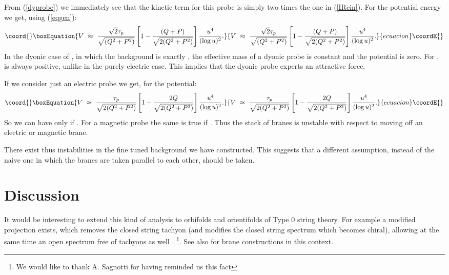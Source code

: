 \documentclass[a4paper,12pt]{article}
\begin{document}
From (\ref{dyprobe}) we immediately see that the kinetic term for this probe is
simply two times the one in (\ref{IRcin}). For the potential energy we get, 
using (\ref{eqgen}):
\begin{equation}\coord{}\boxEquation{
V~\approx~ {{\sqrt {2}\tau_p}\over{\sqrt {(Q^2 + P^2)}}}\left[ 1- {(Q+ P)\over{\sqrt{2(Q^2 + P^2)}}}\right]{u^4\over(\log u)^2} .
}{
V~\approx~ {{\sqrt {2}\tau_p}\over{\sqrt {(Q^2 + P^2)}}}\left[ 1- {(Q+ P)\over{\sqrt{2(Q^2 + P^2)}}}\right]{u^4\over(\log u)^2} .
}{ecuacion}\coordE{}\end{equation}
In the dyonic case \coordHE{} of \cite{kt1}, in which the background is exactly \coordHE{}, the effective mass of a dyonic probe is constant and the potential is zero. For \coordHE{}, \coordHE{} is always positive, unlike in the purely electric case. This implies that the dyonic probe experts an attractive 
force. 

If we consider just an electric  probe we get, for the potential:
\begin{equation}\coord{}\boxEquation{
V~\approx~ {\tau_p\over \sqrt {2(Q^2 + P^2)}}\left[1- {2Q\over{\sqrt{2(Q^2 + P^2)}}}\right]{u^4\over(\log u)^2}.
}{
V~\approx~ {\tau_p\over \sqrt {2(Q^2 + P^2)}}\left[1- {2Q\over{\sqrt{2(Q^2 + P^2)}}}\right]{u^4\over(\log u)^2}.
}{ecuacion}\coordE{}\end{equation}
So we can have \coordHE{} only if \coordHE{}. For a magnetic probe the same is true if \coordHE{}. Thus the stack of \coordHE{} branes is unstable with respect to moving off
an electric or magnetic brane.

There exist thus instabilities in the fine tuned background we have constructed. This suggests that a different assumption, instead of the naive one in which the branes are taken parallel to each other, should be taken.
\section{Discussion}
It would be interesting to extend this kind of analysis to orbifolds and orientifolds
of Type 0 string theory. For example a modified \myHighlight{$\Omega$}\coordHE{} projection exists,
which removes the closed string tachyon (and modifies the closed string spectrum which becomes chiral), allowing at the same time
an open \coordHE{} spectrum free of tachyons as well \cite{sagnotti}.
\footnote{We would like to thank A. Sagnotti for having reminded us this fact}. See also \cite{dudas} for brane constructions in this context.
\end{document}
